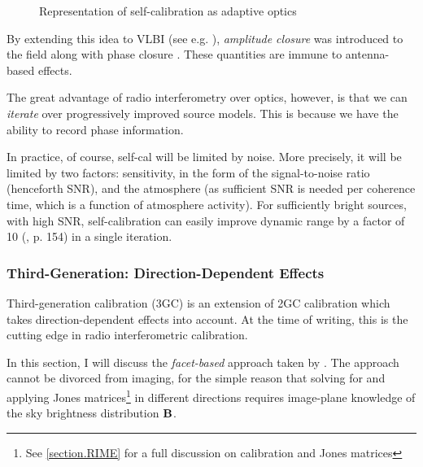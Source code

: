 \begin{figure}[h!]
\centering
{}
\caption{\label{fig.selfcal} Representation of self-calibration as adaptive optics}
\end{figure}

\pg
By extending this idea to VLBI (see e.g.  ), \emph{amplitude closure} was introduced to the field along with phase closure . These quantities are immune to antenna-based effects.%

\pg
The great advantage of radio interferometry over optics, however, is that we can \emph{iterate} over progressively improved source models. This is because we have the ability to record phase information.

\pg
In practice, of course, self-cal will be limited by noise. More precisely, it will be limited by two factors: sensitivity, in the form of the signal-to-noise ratio (henceforth SNR), and the atmosphere (as sufficient SNR is needed per coherence time, which is a function of atmosphere activity). For sufficiently bright sources, with high SNR, self-calibration can easily improve dynamic range by a factor of 10 (\cite{serendipitous}, p. 154) in a single iteration. 

\subsubsection{Third-Generation: Direction-Dependent Effects}

\pg
Third-generation calibration (3GC) is an extension of 2GC calibration which takes direction-dependent effects into account. At the time of writing, this is the cutting edge in radio interferometric calibration.

\pg
In this section, I will discuss the \emph{facet-based} approach taken by . The approach cannot be divorced from imaging, for the simple reason that solving for and applying Jones matrices\footnote{See \cref{section.RIME} for a full discussion on calibration and Jones matrices} in different directions requires image-plane knowledge of the sky brightness distribution $\textbf{B}$. %

